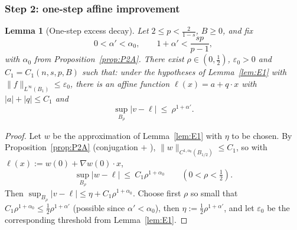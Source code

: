 \documentclass[11pt]{amsart}
\theoremstyle{plain}
\newtheorem{lemma}[theorem]{Lemma}
\theoremstyle{definition}
\theoremstyle{remark}
\newcommand{\al}{\alpha}
\begin{document}
\subsubsection*{Step 2: one-step affine improvement}
\begin{lemma}[One-step excess decay]\label{lem:E2}
Let $2\le p<\frac2{1-s}$, $B\ge0$, and fix
\begin{equation}\label{eq:alpha-choice}
  0<\al'<\al_0,
  \qquad
  1+\al'<\frac{sp}{p-1},
\end{equation}
with $\al_0$ from Proposition~\ref{prop:P2A}. There exist
$\rho\in(0,\tfrac12)$, $\varepsilon_0>0$ and $C_1=C_1(n,s,p,B)$ such that:
under the hypotheses of Lemma~\ref{lem:E1} with
$\|f\|_{L^\infty(B_1)}\le\varepsilon_0$, there is an affine function
$\ell(x)=a+q\cdot x$ with $|a|+|q|\le C_1$ and
\[
  \sup_{B_\rho}|v-\ell|\ \le\ \rho^{1+\al'} .
\]
\end{lemma}
\begin{proof}
Let $w$ be the approximation of Lemma~\ref{lem:E1} with $\eta$ to be
chosen. By Proposition~\ref{prop:P2A} \textnormal{(}conjugation $+$
\cite[Thm~1.1]{GJS}\textnormal{)},
$\|w\|_{C^{1,\al_0}(B_{1/2})}\le C_1$, so with
$\ell(x):=w(0)+\nabla w(0)\cdot x$,
\[
  \sup_{B_\rho}|w-\ell|\ \le\ C_1\rho^{1+\al_0}
  \qquad(0<\rho<\tfrac12).
\]
Then $\sup_{B_\rho}|v-\ell|\le\eta+C_1\rho^{1+\al_0}$. Choose first
$\rho$ so small that $C_1\rho^{1+\al_0}\le\frac12\rho^{1+\al'}$
\textnormal{(}possible since $\al'<\al_0$\textnormal{)}, then
$\eta:=\frac12\rho^{1+\al'}$, and let $\varepsilon_0$ be the corresponding
threshold from Lemma~\ref{lem:E1}.
\end{proof}
\end{document}
